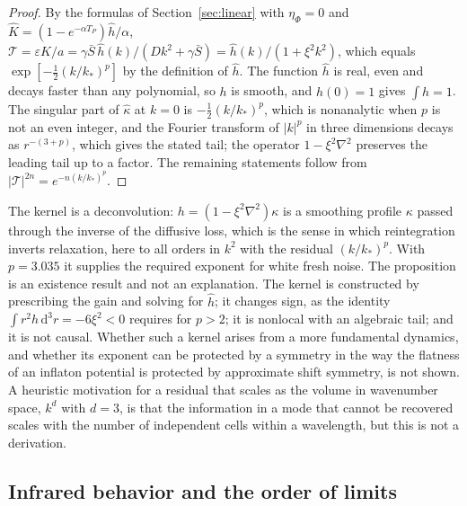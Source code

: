 \documentclass[11pt]{article}
\theoremstyle{definition}
\theoremstyle{remark}
\newcommand{\dd}{\mathrm{d}}
\newcommand{\TT}{\mathcal{T}}
\newcommand{\Sb}{\bar{S}}
\begin{document}
\begin{proof}
By the formulas of Section~\ref{sec:linear} with $\eta_\Phi=0$ and $\hat K=(1-e^{-\alpha T_P})\hat h/\alpha$, $\TT=\varepsilon\hat K/a=\gamma\Sb\,\hat h(k)/(Dk^2+\gamma\Sb)=\hat h(k)/(1+\xi^2k^2)$, which equals $\exp[-\frac12(k/k_*)^p]$ by the definition of $\hat h$. The function $\hat h$ is real, even and decays faster than any polynomial, so $h$ is smooth, and $\hat h(0)=1$ gives $\int h=1$. The singular part of $\hat\kappa$ at $k=0$ is $-\tfrac12(k/k_*)^p$, which is nonanalytic when $p$ is not an even integer, and the Fourier transform of $|k|^p$ in three dimensions decays as $r^{-(3+p)}$, which gives the stated tail; the operator $1-\xi^2\nabla^2$ preserves the leading tail up to a factor. The remaining statements follow from $|\TT|^{2n}=e^{-n(k/k_*)^p}$.
\end{proof}

The kernel is a deconvolution: $h=(1-\xi^2\nabla^2)\kappa$ is a smoothing profile $\kappa$ passed through the inverse of the diffusive loss, which is the sense in which reintegration inverts relaxation, here to all orders in $k^2$ with the residual $(k/k_*)^p$. With $p=3.035$ it supplies the required exponent for white fresh noise. The proposition is an existence result and not an explanation. The kernel is constructed by prescribing the gain and solving for $\hat h$; it changes sign, as the identity $\int r^2h\,\dd^3r=-6\xi^2<0$ requires for $p>2$; it is nonlocal with an algebraic tail; and it is not causal. Whether such a kernel arises from a more fundamental dynamics, and whether its exponent can be protected by a symmetry in the way the flatness of an inflaton potential is protected by approximate shift symmetry, is not shown. A heuristic motivation for a residual that scales as the volume in wavenumber space, $k^d$ with $d=3$, is that the information in a mode that cannot be recovered scales with the number of independent cells within a wavelength, but this is not a derivation.

\subsection{Infrared behavior and the order of limits}
\end{document}
